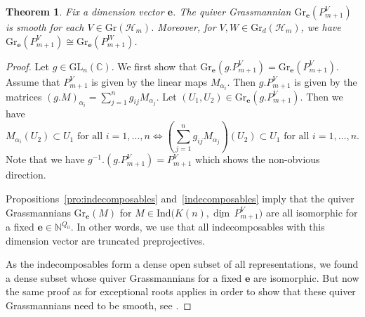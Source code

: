 \documentclass{amsart}
\newtheorem{theorem}{Theorem}[section]
\numberwithin{equation}{section}
\newcommand{\CC}{\mathbb{C}}
\newcommand{\NN}{\mathbb{N}}
\newcommand{\bfe}{\mathbf{e}}
\newcommand{\cH}{\mathcal{H}}
\newcommand\udim{{\underline{\dim}\, }}
\newcommand{\Gr}{\mathrm{Gr}}
\newcommand{\GL}{\mathrm{GL}}
\newcommand{\Ind}{\mathrm{Ind}}
\begin{document}
\begin{theorem}\label{thm:truncpp}
  Fix a dimension vector $\bfe$.
  The quiver Grassmannian $\Gr_\bfe(P_{m+1}^V)$ is smooth for each $V\in \Gr(\cH_m)$.
  Moreover, for $V,W\in \Gr_d(\cH_m)$, we have $\Gr_\bfe(P_{m+1}^V)\cong \Gr_\bfe(P_{m+1}^W)$.
\end{theorem}
\begin{proof}
  Let $g\in\GL_n(\CC)$.
  We first show that $\Gr_\bfe(g.P_{m+1}^V)=\Gr_\bfe(P_{m+1}^V)$.
  Assume that $P_{m+1}^V$ is given by the linear maps $M_{\alpha_i}$.
  Then $g.P_{m+1}^V$ is given by the matrices $(g.M)_{\alpha_i}=\sum\limits_{j=1}^n g_{ij}M_{\alpha_j}$.
  Let $(U_1,U_2)\in\Gr_\bfe(g.P_{m+1}^V)$.
  Then we have  
  \[M_{\alpha_i}(U_2)\subset U_1 \text{ for all } i=1,\ldots,n\Leftrightarrow \left(\sum\limits_{j=1}^n g_{ij}M_{\alpha_j}\right)(U_2)\subset U_1 \text{ for all } i=1,\ldots,n.\]
  Note that we have $g^{-1}.(g.P_{m+1}^V)=P_{m+1}^V$ which shows the non-obvious direction.

  Propositions~\ref{pro:indecomposables} and~\ref{indecomposables} imply that the quiver Grassmannians $\Gr_\bfe(M)$ for $M\in\Ind\big(K(n),\udim P_{m+1}^V\big)$ are all isomorphic for a fixed $\bfe\in\NN^{Q_0}$.
  In other words, we use that all indecomposables with this dimension vector are truncated preprojectives.

  As the indecomposables form a dense open subset of all representations, we found a dense subset whose quiver Grassmannians for a fixed $\bfe$ are isomorphic.
  But now the same proof as for exceptional roots applies in order to show that these quiver Grassmannians need to be smooth, see \cite[Corollary 4]{cr}.
\end{proof}
\end{document}
